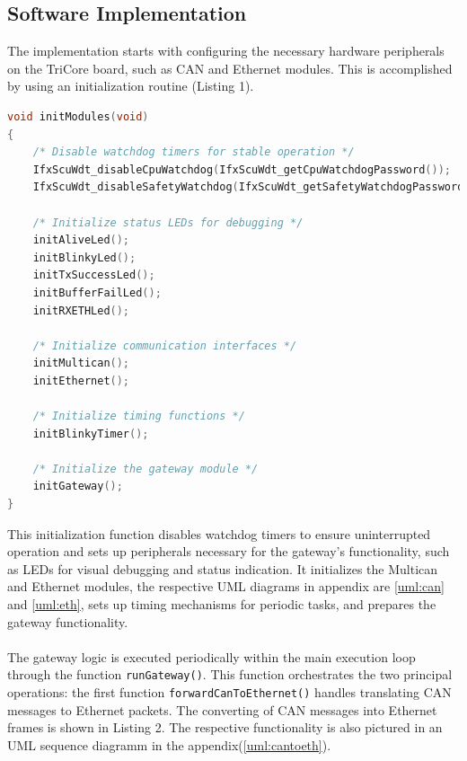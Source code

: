 \subsection{Software Implementation}
The implementation starts with configuring the necessary hardware peripherals on the TriCore board, such as CAN and Ethernet modules. This is accomplished by using an initialization routine (Listing 1).
\begin{lstlisting}[language=C, caption={Initialization of modules (Cpu0\_Main.c)}, label={lst:ini_module}]
void initModules(void)
{
    /* Disable watchdog timers for stable operation */
    IfxScuWdt_disableCpuWatchdog(IfxScuWdt_getCpuWatchdogPassword());
    IfxScuWdt_disableSafetyWatchdog(IfxScuWdt_getSafetyWatchdogPassword());

    /* Initialize status LEDs for debugging */
    initAliveLed();
    initBlinkyLed();
    initTxSuccessLed();
    initBufferFailLed();
    initRXETHLed();

    /* Initialize communication interfaces */
    initMultican();
    initEthernet();

    /* Initialize timing functions */
    initBlinkyTimer();

    /* Initialize the gateway module */
    initGateway();
}
\end{lstlisting}
This initialization function disables watchdog timers to ensure uninterrupted operation and sets up peripherals necessary for the gateway’s functionality, such as LEDs for visual debugging and status indication. It initializes the Multican and Ethernet modules, the respective UML diagrams in appendix are \autoref{uml:can} and \autoref{uml:eth}, sets up timing mechanisms for periodic tasks, and prepares the gateway functionality.\\\\
The gateway logic is executed periodically within the main execution loop through the function \verb|runGateway()|. This function orchestrates the two principal operations: the first function \verb|forwardCanToEthernet()| handles translating CAN messages to Ethernet packets. The converting of CAN messages into Ethernet frames is shown in Listing 2. The respective functionality is also pictured in an UML sequence diagramm in the appendix(\autoref{uml:cantoeth}).
